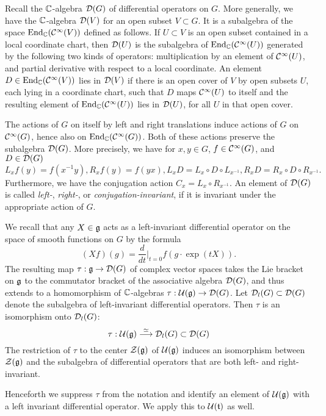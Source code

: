 \documentclass{article}
\theoremstyle{definition}
\numberwithin{equation}{section}
\renewcommand{\-}{\hyp{}}
\newcommand{\g}{\mathfrak g}
\begin{document}
Recall the $\mathbb{C}$-algebra $\mathcal{D}(G)$ of differential operators on $G$. More generally, we have the $\mathbb{C}$-algebra $\mathcal{D}(V)$ for an open subset $V \subset G$. It is a subalgebra of the space $\textrm{End}_{\mathbb{C}}(\mathcal{C}^\infty(V))$ defined as follows. If $U \subset V$ is an open subset contained in a local coordinate chart, then $\mathcal{D}(U)$ is the subalgebra of $\textrm{End}_{\mathbb{C}}(\mathcal{C}^\infty(U))$ generated by the following two kinds of operators: multiplication by an element of $\mathcal{C}^\infty(U)$, and partial derivative with respect to a local coordinate. An element $D \in \textrm{End}_{\mathbb{C}}(\mathcal{C}^\infty(V))$ lies in $\mathcal{D}(V)$ if there is an open cover of $V$ by open subsets $U$, each lying in a coordinate chart, such that $D$ maps $\mathcal{C}^\infty(U)$ to itself and the resulting element of $\textrm{End}_{\mathbb{C}}(\mathcal{C}^\infty(U))$ lies in $\mathcal{D}(U)$, for all $U$ in that open cover. 

The actions of $G$ on itself by left and right translations induce actions of $G$ on $\mathcal{C}^\infty(G)$, hence also on $\textrm{End}_{\mathbb{C}}(\mathcal{C}^\infty(G))$. Both of these actions preserve the subalgebra $\mathcal{D}(G)$. More precisely, we have for $x,y \in G$, $f \in \mathcal{C}^\infty(G)$, and $D \in \mathcal{D}(G)$
\[ L_xf(y) = f(x^{-1}y), R_xf(y)=f(yx), L_xD = L_x \circ D \circ L_{x^{-1}}, R_xD = R_x \circ D \circ R_{x^{-1}}.\]
Furthermore, we have the conjugation action $C_x=L_x \circ R_{x^{-1}}$. An element of $\mathcal{D}(G)$ is called \emph{left-}, \emph{right-}, or \emph{conjugation-invariant}, if it is invariant under the appropriate action of $G$.

We recall that any $X \in \mathfrak{g}$ acts as a left-invariant differential operator on the space of smooth functions on $G$ by the formula
\[ (Xf)(g) = \frac{d}{dt}\Big|_{t=0}f(g \cdot \exp(tX)). \]
The resulting map $\tau : \mathfrak{g} \to \mathcal{D}(G)$ of complex vector spaces takes the Lie bracket on $\mathfrak{g}$ to the commutator bracket of the associative algebra $\mathcal{D}(G)$, and thus extends to a homomorphism of $\mathbb{C}$-algebras
$\tau : \mathcal{U}(\mathfrak{g}) \to \mathcal{D}(G)$.
Let $\mathcal{D}_l(G) \subset \mathcal{D}(G)$ denote the subalgebra of left-invariant differential operators. Then $\tau$ is an isomorphism onto $\mathcal{D}_l(G)$:
\[
\tau : \mathcal{U}(\mathfrak{g}) \overset\simeq\longrightarrow \mathcal{D}_l(G)\subset \mathcal{D}(G)
\]
The restriction of $\tau$ to the center $\mathcal{Z}(\mathfrak{g})$ of $\mathcal{U}(\mathfrak{g})$ induces an isomorphism between $\mathcal{Z}(\mathfrak{g})$ and the subalgebra of differential operators that are both left- and right-invariant.

Henceforth we suppress $\tau$ from the notation and identify an element of $\mc{U}(\g)$ with a left invariant differential operator.
We apply this to $\mathcal{U}(\mathfrak{t})$ as well.
\end{document}

